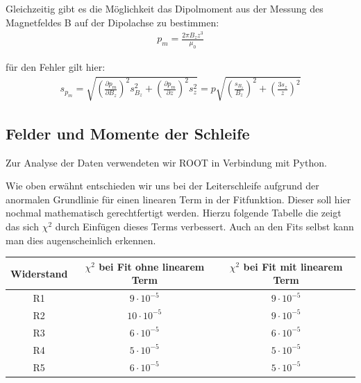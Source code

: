 \documentclass[12pt]{article}
\begin{document}
Gleichzeitig gibt es die Möglichkeit das Dipolmoment aus der Messung des Magnetfeldes B auf der Dipolachse zu bestimmen:
\begin{align}
 p_m=\frac{2\pi B_z z^3}{\mu_0}
\end{align}

für den Fehler gilt hier:
\begin{align}
 s_{p_m}=\sqrt{\left( \frac{\partial p_m}{\partial B_z}\right) ^2 s_{B_z}^2+ \left( \frac{\partial p_m}{\partial z}\right) ^2 s_z^2} = p \sqrt{\left( \frac{s_{B_z}}{B_z}\right) ^2 + \left( \frac{3 s_z}{z}\right) ^2}
\end{align}

\subsection{Felder und Momente der Schleife}
Zur Analyse der Daten verwendeten wir ROOT in Verbindung mit Python.

Wie oben erwähnt entschieden wir uns bei der Leiterschleife aufgrund der anormalen Grundlinie für einen linearen Term in der Fitfunktion. Dieser soll hier nochmal mathematisch gerechtfertigt werden. Hierzu folgende Tabelle die zeigt das sich $\chi^2$ durch Einfügen dieses Terms verbessert. Auch an den Fits selbst kann man dies augenscheinlich erkennen.

\begin{center}
\begin{tabular}{|c|cc|}
\hline
Widerstand & $\chi^2$ bei Fit ohne linearem Term & $\chi^2$ bei Fit mit linearem Term \\ 
\hline
R1 & $9 \cdot 10^{-5}$ & $9 \cdot 10^{-5}$ \\ 
R2 & $10 \cdot 10^{-5}$ & $9 \cdot 10^{-5}$ \\ 
R3 & $6 \cdot 10^{-5}$ & $6 \cdot 10^{-5}$ \\ 
R4 & $5 \cdot 10^{-5}$ & $5 \cdot 10^{-5}$ \\ 
R5 & $6 \cdot 10^{-5}$ & $5 \cdot 10^{-5}$ \\
\hline
\end{tabular}
\end{center}
\end{document}
